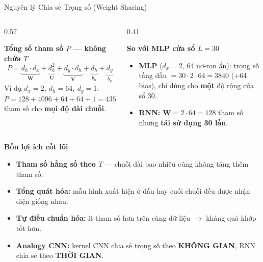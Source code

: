 \documentclass[aspectratio=169, 10pt]{beamer}
\begin{document}
\begin{frame}{Nguyên lý Chia sẻ Trọng số (Weight Sharing)}
\vspace{0.05cm}
\begin{columns}[T]
\begin{column}{0.57\textwidth}
\begin{block}{\textbf{Tổng số tham số \(P\) — không chứa \(T\)}}
{\small
\[
P = \underbrace{d_h \cdot d_x}_{\mathbf{W}} + \underbrace{d_h^2}_{\mathbf{U}} + \underbrace{d_y \cdot d_h}_{\mathbf{V}} + \underbrace{d_h}_{b_h} + \underbrace{d_y}_{b_y}
\]}
Ví dụ \(d_x = 2,\ d_h = 64,\ d_y = 1\): \(P = 128 + 4096 + 64 + 64 + 1 = 4353\) tham số cho \textbf{mọi độ dài chuỗi}.
\end{block}
\end{column}
\begin{column}{0.41\textwidth}
\begin{alertblock}{\textbf{So với MLP cửa sổ \(L=30\)}}
{\scriptsize
\begin{itemize}\itemsep1pt
    \item \textbf{MLP} (\(d_x=2\), 64 nơ-ron ẩn): trọng số tầng đầu \(= 30 \cdot 2 \cdot 64 = 3840\) (+64 bias), chỉ dùng cho \textbf{một} độ rộng cửa sổ 30.
    \item \textbf{RNN:} \(\mathbf{W} = 2 \cdot 64 = 128\) tham số nhưng \textbf{tái sử dụng 30 lần}.
\end{itemize}}
\end{alertblock}
\end{column}
\end{columns}

\vspace{0.05cm}
\begin{exampleblock}{\textbf{Bốn lợi ích cốt lõi}}
{\scriptsize
\begin{itemize}\itemsep1pt
    \item \textbf{Tham số hằng số theo \(T\)} — chuỗi dài bao nhiêu cũng không tăng thêm tham số.
    \item \textbf{Tổng quát hóa:} mẫu hình xuất hiện ở đầu hay cuối chuỗi đều được nhận diện giống nhau.
    \item \textbf{Tự điều chuẩn hóa:} ít tham số hơn trên cùng dữ liệu \(\rightarrow\) kháng quá khớp tốt hơn.
    \item \textbf{Analogy CNN:} kernel CNN chia sẻ trọng số theo \textbf{KHÔNG GIAN}, RNN chia sẻ theo \textbf{THỜI GIAN}.
\end{itemize}}
\end{exampleblock}
\end{frame}
\end{document}
